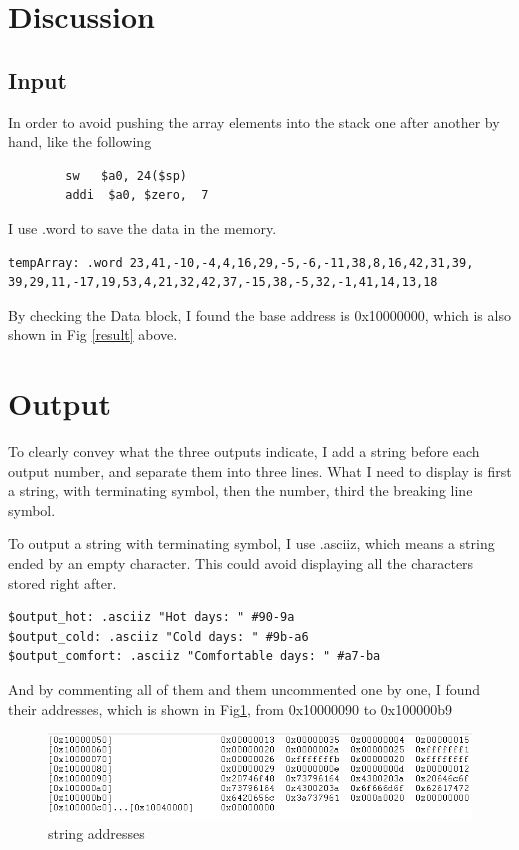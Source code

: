 \documentclass[a4paper,12pt]{article}
\begin{document}
\section{Discussion}
\subsection{Input}
\par In order to avoid pushing the array elements into the stack one after another by hand, like the following

\begin{lstlisting}
        sw   $a0, 24($sp)
        addi  $a0, $zero,  7
\end{lstlisting}

I use .word to save the data in the memory. 

\begin{lstlisting}
tempArray: .word 23,41,-10,-4,4,16,29,-5,-6,-11,38,8,16,42,31,39,
39,29,11,-17,19,53,4,21,32,42,37,-15,38,-5,32,-1,41,14,13,18
\end{lstlisting}
By checking the Data block, I found the base address is 0x10000000, which is also shown in Fig \ref{result} above.

\section{Output}
\par To clearly convey what the three outputs indicate, I add a string before each output number, and separate them into three lines. What I need to display is first a string, with terminating symbol, then the number, third the breaking line symbol.
\par To output a string with terminating symbol, I use .asciiz, which means a string ended by an empty character. This could avoid displaying all the characters stored right after. 
\begin{lstlisting}
$output_hot: .asciiz "Hot days: " #90-9a
$output_cold: .asciiz "Cold days: " #9b-a6
$output_comfort: .asciiz "Comfortable days: " #a7-ba
\end{lstlisting}
And by commenting all of them and them uncommented one by one, I found their addresses, which is shown in Fig\ref{straddr}, from 0x10000090 to 0x100000b9
\begin{figure}[H]
\centering
\includegraphics[scale=0.7]{stringadd.png}
\caption{string addresses}
\label{straddr}
\end{figure}
\end{document}
